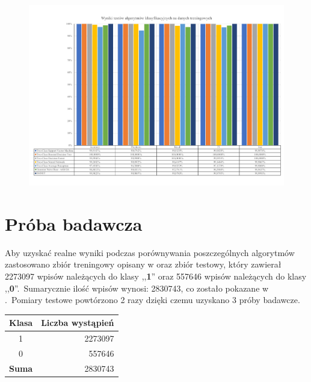 \begin{landscape}
    \vspace*{\fill}
    \begin{figure}[H]
        \centering
        \includegraphics[height=0.8\textwidth]{images/predict_same}
        \label{fig:predict-same}
    \end{figure}
    \vfill
\end{landscape}


\section{Próba badawcza}
Aby uzyskać realne wyniki podczas porównywania poszczególnych algorytmów zastosowano zbiór treningowy opisany w  oraz zbiór testowy, który zawierał 2273097 wpisów należących do klasy ,,\textbf{1}'' oraz 557646 wpisów należących do klasy ,,\textbf{0}''.\ Sumarycznie ilość wpisów wynosi: 2830743, co zostało pokazane w .\ Pomiary testowe powtórzono 2 razy dzięki czemu uzyskano 3 próby badawcze.

\begin{table}[H]
    \centering
    \label{tab:res-test}
    \begin{tabular}{|c|r|}
        \hline
        \textbf{Klasa} & \textbf{Liczba wystąpień} \\ \hline
        1              & 2273097                   \\ \hline
        0              & 557646                    \\ \hline
        \textbf{Suma}  & 2830743                   \\ \hline
    \end{tabular}
\end{table}

